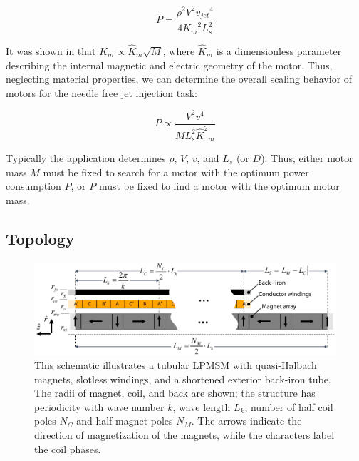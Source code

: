         \begin{equation}
            P=\frac{\rho^2V^2{v_{jet}}^4}{4{K_m}^2 L_s^2}
            \label{eq:power dissipation for PMLSMs}
        \end{equation}
        
        
        It was shown in \cite{Ruddy2011a} that $K_m \propto {\hat K}_m \sqrt M$, where ${\hat K}_m$ is a dimensionless parameter describing the internal magnetic and electric geometry of the motor. Thus, neglecting material properties, we can determine the overall scaling behavior of motors for the needle free jet injection task:
        
        
        \begin{equation}
            P\propto\frac{V^2v^4}{ {M L_s^2{\hat K^2}_m} }
            \label{eq:scaling law for PMLSMs}
        \end{equation}
        
        
        Typically the application determines $\rho$, $V$, $v$, and $L_s$ (or $D$). Thus, either motor mass $M$ must be fixed to search for a motor with the optimum power consumption $P$, or $P$ must be fixed to find a motor with the optimum motor mass.


    \subsection{Topology}                       \label{Chapter:PMLSM design HM/electromagnetic model/topology}
    
    
        \begin{figure}[ht]
          \centering
          \includegraphics[width=5.8in]{chap3/images/PMLSM.pdf}
          \caption{This schematic illustrates a tubular LPMSM with quasi-Halbach magnets, slotless windings, and a shortened exterior back-iron tube. The radii of magnet, coil, and back are shown; the structure has periodicity with wave number $k$, wave length $L_k$, number of half coil poles $N_C$ and half magnet poles $N_M$. The arrows indicate the direction of magnetization of the magnets, while the characters label the coil phases.}
          \label{fig:chapter/hm/PMLSM motor construction fullpage}
        \end{figure}
    

